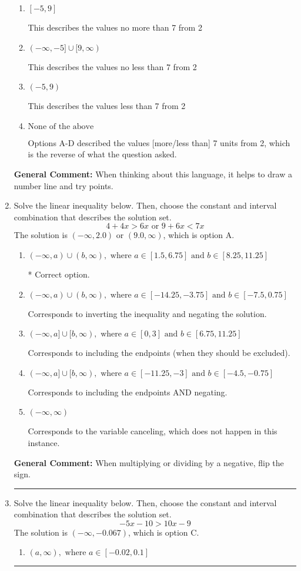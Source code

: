 \documentclass{extbook}[14pt]
\newcommand{\litem}[1]{\item #1

\rule{\textwidth}{0.4pt}}
\begin{document}
\begin{enumerate}
{\begin{enumerate}[label=\Alph*.]
This describes the values more than 7 from 2
\item \( [-5, 9] \)

This describes the values no more than 7 from 2
\item \( (-\infty, -5] \cup [9, \infty) \)

This describes the values no less than 7 from 2
\item \( (-5, 9) \)

This describes the values less than 7 from 2
\item \( \text{None of the above} \)

Options A-D described the values [more/less than] 7 units from 2, which is the reverse of what the question asked.
\end{enumerate}

\textbf{General Comment:} When thinking about this language, it helps to draw a number line and try points.
}
\litem{
Solve the linear inequality below. Then, choose the constant and interval combination that describes the solution set.
\[ 4 + 4 x > 6 x \text{ or } 9 + 6 x < 7 x \]The solution is \( (-\infty, 2.0) \text{ or } (9.0, \infty) \), which is option A.\begin{enumerate}[label=\Alph*.]
\item \( (-\infty, a) \cup (b, \infty), \text{ where } a \in [1.5, 6.75] \text{ and } b \in [8.25, 11.25] \)

 * Correct option.
\item \( (-\infty, a) \cup (b, \infty), \text{ where } a \in [-14.25, -3.75] \text{ and } b \in [-7.5, 0.75] \)

Corresponds to inverting the inequality and negating the solution.
\item \( (-\infty, a] \cup [b, \infty), \text{ where } a \in [0, 3] \text{ and } b \in [6.75, 11.25] \)

Corresponds to including the endpoints (when they should be excluded).
\item \( (-\infty, a] \cup [b, \infty), \text{ where } a \in [-11.25, -3] \text{ and } b \in [-4.5, -0.75] \)

Corresponds to including the endpoints AND negating.
\item \( (-\infty, \infty) \)

Corresponds to the variable canceling, which does not happen in this instance.
\end{enumerate}

\textbf{General Comment:} When multiplying or dividing by a negative, flip the sign.
}
\litem{
Solve the linear inequality below. Then, choose the constant and interval combination that describes the solution set.
\[ -5x -10 > 10x -9 \]The solution is \( (-\infty, -0.067) \), which is option C.\begin{enumerate}[label=\Alph*.]
\item \( (a, \infty), \text{ where } a \in [-0.02, 0.1] \)


\end{enumerate}}
\end{enumerate}
\end{document}
